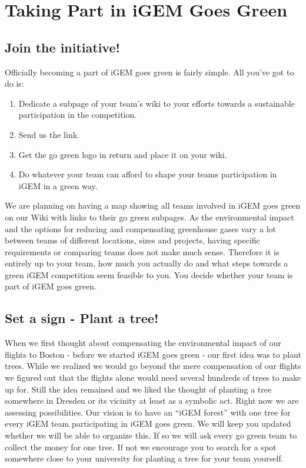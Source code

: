 
\chapter{Taking Part in iGEM Goes Green}\label{chap:takingpart}

\section{Join the initiative!}
Officially becoming a part of iGEM goes green is fairly simple. All you've got to do is:
\begin{enumerate}
	\item Dedicate a subpage of your team's wiki to your efforts towards a sustainable participation in the competition. 
	\item Send us the link.
	\item Get the go green logo in return and place it on your wiki.
	\item Do whatever your team can afford to shape your teams participation in iGEM in a green way.
	
\end{enumerate}
We are planning on having a map showing all teams involved in iGEM goes green on our Wiki with links to their go green subpages. As the environmental impact and the options for reducing and compensating greenhouse gases vary a lot between teams of different locations, sizes and projects, having specific requirements or comparing teams does not make much sense. Therefore it is entirely up to your team, how much you actually do and what steps towards a green iGEM competition seem feasible to you. You decide whether your team is part of iGEM goes green.


\section{Set a sign - Plant a tree!}\label{sec:trees}

When we first thought about compensating the environmental impact of our flights to Boston - before we started iGEM goes green - our first idea was to plant trees. While we realized we would go beyond the mere compensation of our flights we figured out that the flights alone would need several hundreds of trees to make up for. Still the idea remained and we liked the thought of planting a tree somewhere in Dresden or its vicinity at least as a symbolic act. Right now we are assessing possibilities. Our vision is to have an ``iGEM forest'' with one tree for every iGEM team participating in iGEM goes green. We will keep you updated whether we will be able to organize this. If so we will ask every go green team to collect the money for one tree. If not we encourage you to search for a spot somewhere close to your university for planting a tree for your team yourself.

